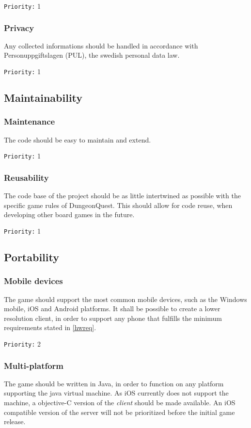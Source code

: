 \documentclass[a4paper,10pt]{article}
\newcommand{\prio}[1]{\texttt{Priority:} #1}
\begin{document}
\prio{1}

\subsubsection{Privacy}
Any collected informations should be handled in accordance with Personuppgiftslagen (PUL), the swedish personal data law.

\prio{1}

\subsection{Maintainability}
\subsubsection{Maintenance}
The code should be easy to maintain and extend.

\prio{1}

\subsubsection{Reusability}
The code base of the project should be as little intertwined as possible with the specific game rules of DungeonQuest. This should allow for code reuse, when developing other board games in the future.

\prio{1}

\subsection{Portability}
\subsubsection{Mobile devices}
The game should support the most common mobile devices, such as the Windows mobile, iOS and Android platforms. It shall be possible to create a lower resolution client, in order to support any phone that fulfills the minimum requirements stated in \ref{hwreq}.

\prio{2}

\subsubsection{Multi-platform}
The game should be written in Java, in order to function on any platform supporting the java virtual machine. As iOS currently does not support the machine, a objective-C version of the \emph{client} should be made available. An iOS compatible version of the server will not be prioritized before the initial game release.
\end{document}
